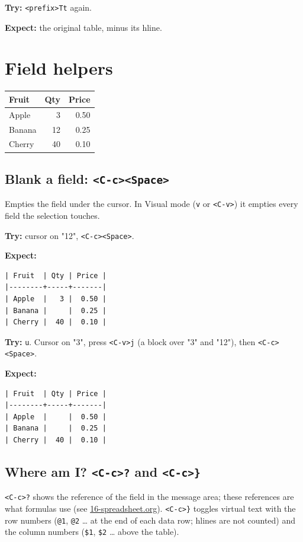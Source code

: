 \textbf{Try:} \texttt{<prefix>Tt} again.

\textbf{Expect:} the original table, minus its hline.
\section{Field helpers}
\label{sec:orga176ef6}
\begin{table}[htbp]
\label{tab:orgb4018d6}
\centering
\begin{tabular}{lrr}
Fruit & Qty & Price\\
\hline
Apple & 3 & 0.50\\
Banana & 12 & 0.25\\
Cherry & 40 & 0.10\\
\end{tabular}
\end{table}
\subsection{Blank a field: \texttt{<C-c><Space>}}
\label{sec:org063e364}
Empties the field under the cursor. In Visual mode (\texttt{v} or \texttt{<C-v>}) it
empties every field the selection touches.

\textbf{Try:} cursor on "12", \texttt{<C-c><Space>}.

\textbf{Expect:}
\begin{verbatim}
| Fruit  | Qty | Price |
|--------+-----+-------|
| Apple  |   3 |  0.50 |
| Banana |     |  0.25 |
| Cherry |  40 |  0.10 |
\end{verbatim}

\textbf{Try:} \texttt{u}. Cursor on "3", press \texttt{<C-v>j} (a block over "3" and "12"), then
\texttt{<C-c><Space>}.

\textbf{Expect:}
\begin{verbatim}
| Fruit  | Qty | Price |
|--------+-----+-------|
| Apple  |     |  0.50 |
| Banana |     |  0.25 |
| Cherry |  40 |  0.10 |
\end{verbatim}
\subsection{Where am I? \texttt{<C-c>?} and \texttt{<C-c>\}}}
\label{sec:orgcf0df04}
\texttt{<C-c>?} shows the reference of the field in the message area; these
references are what formulas use (see
\href{16-spreadsheet.org}{16-spreadsheet.org}).
\texttt{<C-c>\}} toggles virtual text with the row numbers (\texttt{@1}, \texttt{@2} \ldots{} at the end
of each data row; hlines are not counted) and the column numbers (\texttt{\$1},
\texttt{\$2} \ldots{} above the table).

